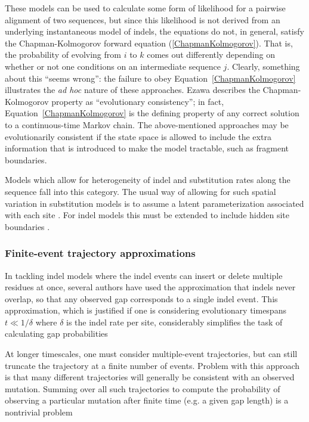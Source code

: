 \documentclass{bmcart}
\newcommand{\eqref}[1]{Equation~\ref{#1}}
\begin{document}
These models can be used to calculate some form of likelihood for a pairwise alignment of two sequences,
but since this likelihood is not derived from an underlying instantaneous model of indels,
the equations do not, in general, satisfy the Chapman-Kolmogorov forward equation
(\ref{ChapmanKolmogorov}).
That is, the probability of evolving from $i$ to $k$ comes out differently
depending on whether or not one conditions on an intermediate sequence $j$.
Clearly, something about this ``seems wrong'':
the failure to obey \eqref{ChapmanKolmogorov} illustrates the {\em ad hoc}
nature of these approaches.
Ezawa \cite{Ezawa2016b} describes the Chapman-Kolmogorov property as ``evolutionary consistency'';
in fact, \eqref{ChapmanKolmogorov} is the defining property
of any correct solution to a continuous-time Markov chain.
The above-mentioned approaches may be evolutionarily consistent if the state space
is allowed to include the extra information that is introduced to make the model tractable,
such as fragment boundaries.

Models which allow for heterogeneity of indel and substitution rates along the sequence
fall into this category. The usual way of allowing for such spatial variation
in substitution models is to assume a latent parameterization associated with each site \cite{Yang93,Yang94}.
For indel models this must be extended to include hidden site boundaries \cite{RivasEddy2015}.

\subsubsection*{Finite-event trajectory approximations}

In tackling indel models where the indel events can insert or delete multiple residues at once,
several authors have used the approximation that indels never overlap,
so that any observed gap corresponds to a single indel event.
This approximation, which is justified if one is considering evolutionary timespans $t \ll 1/\delta$
where $\delta$ is the indel rate per site,
considerably simplifies the task of calculating gap probabilities
\cite{KnudsenMiyamoto2003,RedelingsSuchard2005,SuchardRedelings2006,RedelingsSuchard2007,WestessonEtAlArxiv2011,WestessonEtAl2012,WestessonBarquistHolmes2012}

At longer timescales, one must consider multiple-event trajectories, but can still truncate the trajectory
at a finite number of events.
Problem with this approach is that many different trajectories will generally be consistent with an observed mutation.
Summing over all such trajectories to compute the probability of observing a particular mutation after finite time
(e.g. a given gap length)
is a nontrivial problem
\end{document}
